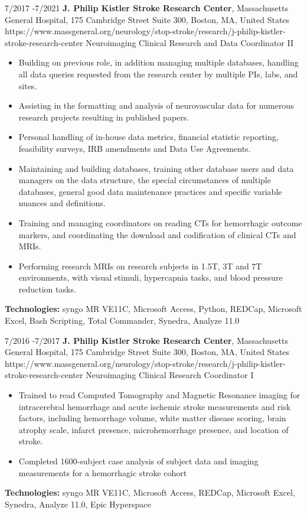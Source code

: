 \documentclass[10pt]{article} %
\begin{document}
\job
{7/2017 -}{7/2021}
{\textbf{J. Philip Kistler Stroke Research Center}, Massachusetts General Hospital, 175 Cambridge Street Suite 300, Boston, MA, United States}
{https://www.massgeneral.org/neurology/stop-stroke/research/j-philip-kistler-stroke-research-center}
{Neuroimaging Clinical Research and Data Coordinator II}
{
\begin{itemize}
\item Building on previous role, in addition managing multiple databases, handling all data queries requested from the research center by multiple PIs, labs, and sites.
\item Assisting in the formatting and analysis of neurovascular data for numerous research projects resulting in published papers.
\item Personal handling of in-house data metrics, financial statistic reporting, feasibility surveys, IRB amendments and Data Use Agreements.
\item Maintaining and building databases, training other database users and data managers on the data structure, the special circumstances of multiple databases, general good data maintenance practices and specific variable nuances and definitions.
\item Training and managing coordinators on reading CTs for hemorrhagic outcome markers, and coordinating the download and codification of clinical CTs and MRIs.
\item Performing research MRIs on research subjects in 1.5T, 3T and 7T environments, with visual stimuli, hypercapnia tasks, and blood pressure reduction tasks.
\end{itemize}
\rule{0mm}{5mm}\textbf{Technologies:} syngo MR VE11C, Microsoft Access, Python, REDCap, Microsoft Excel, Bash Scripting, Total Commander, Synedra, Analyze 11.0}


\job
{7/2016 -}{7/2017}
{\textbf{J. Philip Kistler Stroke Research Center}, Massachusetts General Hospital, 175 Cambridge Street Suite 300, Boston, MA, United States}
{https://www.massgeneral.org/neurology/stop-stroke/research/j-philip-kistler-stroke-research-center}
{Neuroimaging Clinical Research Coordinator I}
{
\begin{itemize}
\item Trained to read Computed Tomography and Magnetic Resonance imaging for intracerebral hemorrhage and acute ischemic stroke measurements and risk factors, including hemorrhage volume, white matter disease scoring, brain atrophy scale, infarct presence, microhemorrhage presence, and location of stroke.
\item Completed 1600-subject case analysis of subject data and imaging measurements for a hemorrhagic stroke cohort
\end{itemize}
\rule{0mm}{5mm}\textbf{Technologies:} syngo MR VE11C, Microsoft Access, REDCap, Microsoft Excel, Synedra, Analyze 11.0, Epic Hyperspace}
\end{document}
